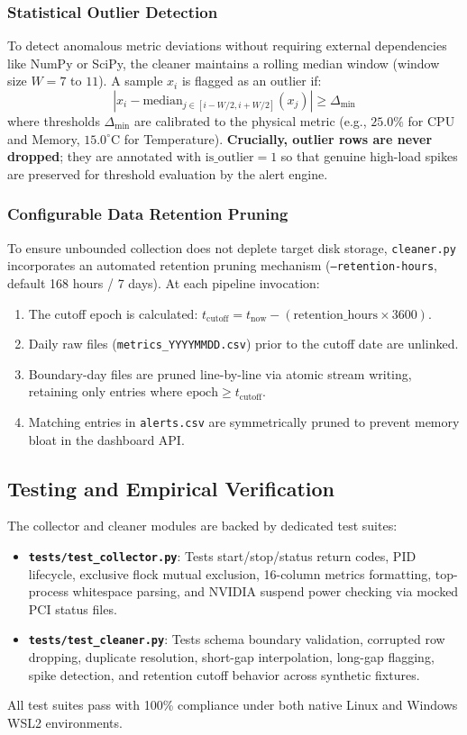 \subsubsection{Statistical Outlier Detection}
To detect anomalous metric deviations without requiring external dependencies like NumPy or SciPy, the cleaner maintains a rolling median window (window size $W = 7$ to $11$). A sample $x_i$ is flagged as an outlier if:
\begin{equation}
    |x_i - \text{median}_{j \in [i-W/2, i+W/2]}(x_j)| \ge \Delta_{\min}
\end{equation}
where thresholds $\Delta_{\min}$ are calibrated to the physical metric (e.g., $25.0\%$ for CPU and Memory, $15.0^\circ\text{C}$ for Temperature). \textbf{Crucially, outlier rows are never dropped}; they are annotated with $\text{is\_outlier} = 1$ so that genuine high-load spikes are preserved for threshold evaluation by the alert engine.

\subsubsection{Configurable Data Retention Pruning}
To ensure unbounded collection does not deplete target disk storage, \texttt{cleaner.py} incorporates an automated retention pruning mechanism (\texttt{--retention-hours}, default 168 hours / 7 days). At each pipeline invocation:
\begin{enumerate}
    \item The cutoff epoch is calculated: $t_{\text{cutoff}} = t_{\text{now}} - (\text{retention\_hours} \times 3600)$.
    \item Daily raw files (\texttt{metrics\_YYYYMMDD.csv}) prior to the cutoff date are unlinked.
    \item Boundary-day files are pruned line-by-line via atomic stream writing, retaining only entries where $\text{epoch} \ge t_{\text{cutoff}}$.
    \item Matching entries in \texttt{alerts.csv} are symmetrically pruned to prevent memory bloat in the dashboard API.
\end{enumerate}

\subsection{Testing and Empirical Verification}
The collector and cleaner modules are backed by dedicated test suites:
\begin{itemize}
    \item \textbf{\texttt{tests/test\_collector.py}}: Tests start/stop/status return codes, PID lifecycle, exclusive flock mutual exclusion, 16-column metrics formatting, top-process whitespace parsing, and NVIDIA suspend power checking via mocked PCI status files.
    \item \textbf{\texttt{tests/test\_cleaner.py}}: Tests schema boundary validation, corrupted row dropping, duplicate resolution, short-gap interpolation, long-gap flagging, spike detection, and retention cutoff behavior across synthetic fixtures.
\end{itemize}
All test suites pass with 100\% compliance under both native Linux and Windows WSL2 environments.
